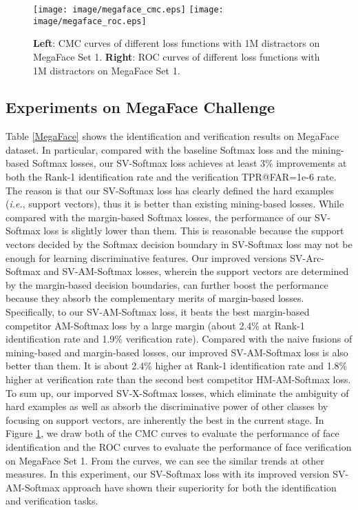 \documentclass[10pt,twocolumn,letterpaper]{article}
\begin{document}
\begin{figure}[t]
\begin{center}
\texttt{[image: image/megaface\_cmc.eps]}
   \texttt{[image: image/megaface\_roc.eps]}
\end{center}
   \caption{\textbf{Left}: CMC curves of different loss functions with 1M distractors on MegaFace \cite{megaface_1} Set 1. \textbf{Right}: ROC curves of different loss functions with 1M distractors on MegaFace \cite{megaface_1} Set 1.}
\label{fig:mega}
\end{figure}

\subsection{Experiments on MegaFace Challenge}
Table \ref{MegaFace} shows the identification and verification results on MegaFace dataset. In particular, compared with the baseline Softmax loss and the mining-based Softmax losses, our SV-Softmax loss achieves at least 3\% improvements at both the Rank-1 identification rate and the verification TPR@FAR=1e-6 rate. The reason is that our SV-Softmax loss has clearly defined the hard examples (\textit{i.e.}, support vectors), thus it is better than existing mining-based losses. While compared with the margin-based Softmax losses, the performance of our SV-Softmax loss is slightly lower than them. This is reasonable because the support vectors decided by the Softmax decision boundary in SV-Softmax loss may not be enough for learning discriminative features. Our improved versions SV-Arc-Softmax and SV-AM-Softmax losses, wherein the support vectors are determined by the margin-based decision boundaries, can further boost the performance because they absorb the complementary merits of margin-based losses. Specifically, to our SV-AM-Softmax loss, it beats the best margin-based competitor AM-Softmax loss by a large margin (about 2.4\% at Rank-1 identification rate and 1.9\% verification rate). Compared with the naive fusions of mining-based and margin-based losses, our improved SV-AM-Softmax loss is also better than them. It is about 2.4\% higher at Rank-1 identification rate and 1.8\% higher at verification rate than the second best competitor HM-AM-Softmax loss. To sum up, our imporved SV-X-Softmax losses, which eliminate the ambiguity of hard examples as well as absorb the discriminative power of other classes by focusing on support vectors, are inherently the best in the current stage. In Figure \ref{fig:mega}, we draw both of the CMC curves to evaluate the performance of face identification and the ROC curves to evaluate the performance of face verification on MegaFace Set 1. From the curves, we can see the similar trends at other measures. In this experiment, our SV-Softmax loss with its improved version SV-AM-Softmax approach have shown their superiority for both the identification and verification tasks.
\end{document}
